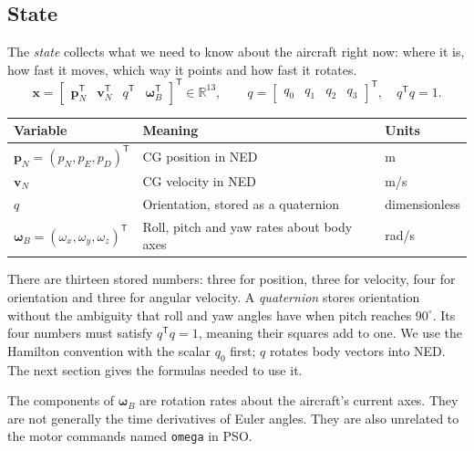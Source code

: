 \documentclass[11pt,a4paper]{article}
\numberwithin{equation}{section}
\newcommand{\vect}[1]{\boldsymbol{#1}}
\newcommand{\R}{\mathbb{R}}
\newcommand{\trans}{^{\mathsf T}}
\begin{document}
\subsection{State}
The \emph{state} collects what we need to know about the aircraft right now:
where it is, how fast it moves, which way it points and how fast it rotates.
\begin{equation}\label{eq:state}
  \vect x=
  \begin{bmatrix}\vect p_N\trans&\vect v_N\trans&q\trans&\vect\omega_B\trans\end{bmatrix}\trans
  \in\R^{13},\qquad
  q=\begin{bmatrix}q_0&q_1&q_2&q_3\end{bmatrix}\trans,\quad q\trans q=1.
\end{equation}
\begin{center}
\begin{tabular}{lll}
\hline
Variable & Meaning & Units \\
\hline
$\vect p_N=(p_N,p_E,p_D)\trans$ & CG position in NED & m \\
$\vect v_N$ & CG velocity in NED & m/s \\
$q$ & Orientation, stored as a quaternion & dimensionless \\
$\vect\omega_B=(\omega_x,\omega_y,\omega_z)\trans$ & Roll, pitch and yaw rates about body axes & rad/s \\
\hline
\end{tabular}
\end{center}
There are thirteen stored numbers: three for position, three for velocity,
four for orientation and three for angular velocity.
A \emph{quaternion} stores orientation without the ambiguity that roll and
yaw angles have when pitch reaches $90^\circ$. Its four numbers must
satisfy $q\trans q=1$, meaning their squares add to one. We use the Hamilton
convention with the scalar $q_0$ first; $q$ rotates body vectors into NED.
The next section gives the formulas needed to use it.

The components of $\vect\omega_B$ are rotation rates about the aircraft's
current axes. They are not generally the time derivatives of Euler angles.
They are also unrelated to the motor commands named \texttt{omega} in PSO.
\end{document}
